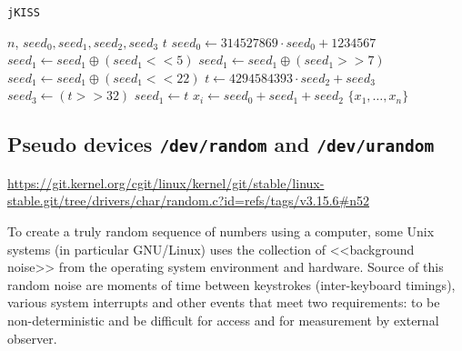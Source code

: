 \documentclass[%
floatfix,
showkeys,
nofootinbib, %
superscriptaddress, %
]{revtex4-1}
\begin{document}
\begin{minipage}[t]{0.5\textwidth}
        \vspace{-10pt}
        \begin{algorithm}[H]
                \begin{algorithmic}
                        \caption{\texttt{jKISS}}\label{alg:jkiss}
                        \Require $n$, $seed_{0},seed_{1},seed_{2},seed_{3}$
                        \State $t$
                                \State $seed_{0} \leftarrow 314527869 \cdot seed_{0} + 1234567$
                                \State $seed_{1} \leftarrow seed_{1} \oplus (seed_{1} << 5)$
                                \State $seed_{1} \leftarrow seed_{1} \oplus (seed_{1} >> 7)$
                                \State $seed_{1} \leftarrow seed_{1} \oplus (seed_{1} << 22)$
                                \State $t \leftarrow 4294584393\cdot seed_{2} + seed_{3}$
                                \State $seed_{3} \leftarrow (t >> 32)$
                                \State $seed_{1} \leftarrow t$
                                \State $x_{i} \leftarrow seed_{0} + seed_{1} + seed_{2}$
                        \EndFor
                        \State \Return $\{x_{1},\ldots,x_{n}\}$
                \end{algorithmic}
        \end{algorithm}
\end{minipage}


\subsection{Pseudo devices \texttt{/dev/random} and \texttt{/dev/urandom}}
\url{https://git.kernel.org/cgit/linux/kernel/git/stable/linux-stable.git/tree/drivers/char/random.c?id=refs/tags/v3.15.6#n52}

To create a truly random sequence of numbers using a computer, some
Unix systems (in particular GNU/Linux) uses the collection of
<<background noise>> from the operating system environment and
hardware. Source of this random noise are moments of time between
keystrokes (inter-keyboard timings), various system interrupts and
other events that meet two requirements: to be non-deterministic and
be difficult for access and for measurement by external observer.
\end{document}
